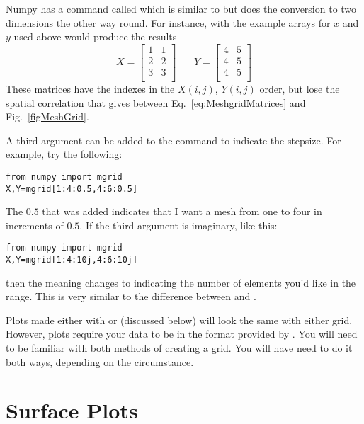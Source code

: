 Numpy has a command called  which is similar to
 but does the conversion to two dimensions the other
way round. For instance, with the example arrays for $x$ and $y$ used
above  would produce the results
\begin{equation}
X = \left[ \begin{array}{ll}
1 & 1 \\
2 & 2 \\
3 & 3 \\
\end{array}
\right]~~~~~~~~ Y = \left[ \begin{array}{ll}
4 & 5 \\
4 & 5 \\
4 & 5 \\
\end{array}
\right]
\end{equation}
These matrices have the indexes in the $X(i,j)$, $Y(i,j)$ order,
but lose the spatial correlation that  gives
between Eq.~\eqref{eq:MeshgridMatrices} and Fig.~\ref{figMeshGrid}.

A third argument can be added to the  command to indicate
the stepsize.  For example, try the following:
\begin{Verbatim}
from numpy import mgrid
X,Y=mgrid[1:4:0.5,4:6:0.5]
\end{Verbatim}
The $0.5$ that was added indicates that I want a mesh from one to four
in increments of $0.5$.  If the third argument is imaginary, like
this:
\begin{Verbatim}
from numpy import mgrid
X,Y=mgrid[1:4:10j,4:6:10j]
\end{Verbatim}
then the meaning changes to indicating the number of elements you'd
like in the range.  This is very similar to the difference between
 and .


Plots made either with  or  (discussed below) will look
the same with either grid.  However,  plots require your
data to be in the format provided by .  You will need to be
familiar with both methods of creating a grid. You will have need to do
it both ways, depending on the circumstance.



\section{Surface Plots}
 

